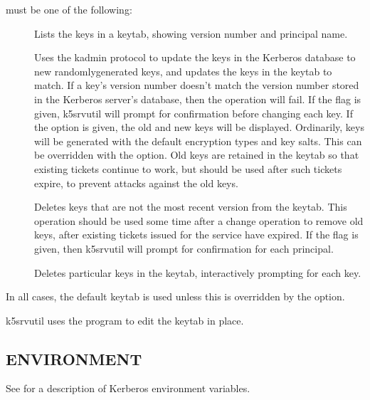 \documentclass[letterpaper,10pt,english]{sphinxmanual}
\begin{document}
\sphinxAtStartPar
{} must be one of the following:
\begin{description}
\item[{}] \leavevmode
\sphinxAtStartPar
Lists the keys in a keytab, showing version number and principal
name.

\item[{}] \leavevmode
\sphinxAtStartPar
Uses the kadmin protocol to update the keys in the Kerberos
database to new randomly\sphinxhyphen{}generated keys, and updates the keys in
the keytab to match.  If a key’s version number doesn’t match the
version number stored in the Kerberos server’s database, then the
operation will fail.  If the  flag is given, k5srvutil will
prompt for confirmation before changing each key.  If the 
option is given, the old and new keys will be displayed.
Ordinarily, keys will be generated with the default encryption
types and key salts.  This can be overridden with the 
option.  Old keys are retained in the keytab so that existing
tickets continue to work, but  should be used after
such tickets expire, to prevent attacks against the old keys.

\item[{}] \leavevmode
\sphinxAtStartPar
Deletes keys that are not the most recent version from the keytab.
This operation should be used some time after a change operation
to remove old keys, after existing tickets issued for the service
have expired.  If the  flag is given, then k5srvutil will
prompt for confirmation for each principal.

\item[{}] \leavevmode
\sphinxAtStartPar
Deletes particular keys in the keytab, interactively prompting for
each key.

\end{description}

\sphinxAtStartPar
In all cases, the default keytab is used unless this is overridden by
the  option.

\sphinxAtStartPar
k5srvutil uses the {\hyperref[\detokenize{admin/admin_commands/kadmin_local:kadmin-1}]{}} program to edit the keytab in
place.


\subsection{ENVIRONMENT}
\label{\detokenize{admin/admin_commands/k5srvutil:environment}}
\sphinxAtStartPar
See  for a description of Kerberos environment
variables.
\end{document}
